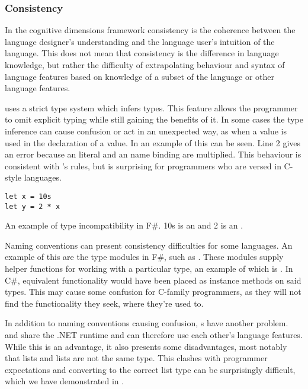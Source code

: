 \subsubsection{Consistency}
In the cognitive dimensions framework consistency is the coherence between the language designer's understanding and the language user's intuition of the language\cite{green1996usability}. This does not mean that consistency is the difference in language knowledge, but rather the difficulty of extrapolating behaviour and syntax of language features based on knowledge of a subset of the language or other language features.

\fs uses a strict type system which infers types. This feature allows the programmer to omit explicit typing while still gaining the benefits of it. In some cases the type inference can cause confusion or act in an unexpected way, as when a  value is used in the declaration of a  value. In  an example of this can be seen. Line 2 gives an error because an  literal and an  name binding are multiplied. This behaviour is consistent with \fs's rules, but is surprising for programmers who are versed in C-style languages.

\begin{listing}[H]
\begin{verbatim}
let x = 10s
let y = 2 * x
\end{verbatim}
\caption{An example of type incompatibility in F\#. 10s is an  and 2 is an .}
\label{lst:type-incompat}
\end{listing}

Naming conventions can present consistency difficulties for some languages. An example of this are the type modules in F\#, such as . These modules supply helper functions for working with a particular type, an example of which is . In C\#, equivalent functionality would have been placed as instance methods on said types. This may cause some confusion for C-family programmers, as they will not find the functionality they seek, where they're used to.

In addition to naming conventions causing confusion, s have another problem. \fs and \cs share the .NET runtime and can therefore use each other's language features. While this is an advantage, it also presents some disadvantages, most notably that \fs lists and \cs lists are not the same type. This clashes with programmer expectations and converting to the correct list type can be surprisingly difficult, which we have demonstrated in .

